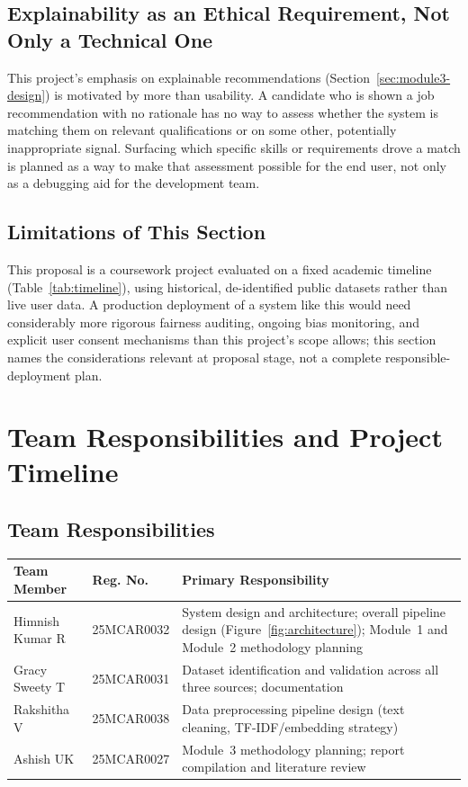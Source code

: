 \documentclass[11pt,a4paper]{article}
\begin{document}
\subsection{Explainability as an Ethical Requirement, Not Only a Technical One}

This project's emphasis on explainable recommendations (Section~\ref{sec:module3-design})
is motivated by more than usability. A candidate who is shown a job recommendation with
no rationale has no way to assess whether the system is matching them on relevant
qualifications or on some other, potentially inappropriate signal. Surfacing which
specific skills or requirements drove a match is planned as a way to make that
assessment possible for the end user, not only as a debugging aid for the development
team.

\subsection{Limitations of This Section}

This proposal is a coursework project evaluated on a fixed academic timeline
(Table~\ref{tab:timeline}), using historical, de-identified public datasets rather than
live user data. A production deployment of a system like this would need considerably
more rigorous fairness auditing, ongoing bias monitoring, and explicit user consent
mechanisms than this project's scope allows; this section names the considerations
relevant at proposal stage, not a complete responsible-deployment plan.

\section{Team Responsibilities and Project Timeline}
\label{sec:team}

\subsection{Team Responsibilities}

\begin{center}
\begin{tabular}{@{}p{3.6cm}p{3cm}p{7cm}@{}}
\toprule
\textbf{Team Member} & \textbf{Reg. No.} & \textbf{Primary Responsibility} \\
\midrule
Himnish Kumar R & 25MCAR0032 & System design and architecture; overall pipeline
design (Figure~\ref{fig:architecture}); Module~1 and Module~2 methodology planning \\
Gracy Sweety T & 25MCAR0031 & Dataset identification and validation across all three
sources; documentation \\
Rakshitha V & 25MCAR0038 & Data preprocessing pipeline design (text cleaning,
TF-IDF/embedding strategy) \\
Ashish UK & 25MCAR0027 & Module~3 methodology planning; report compilation and
literature review \\
\bottomrule
\end{tabular}
\end{center}
\end{document}
